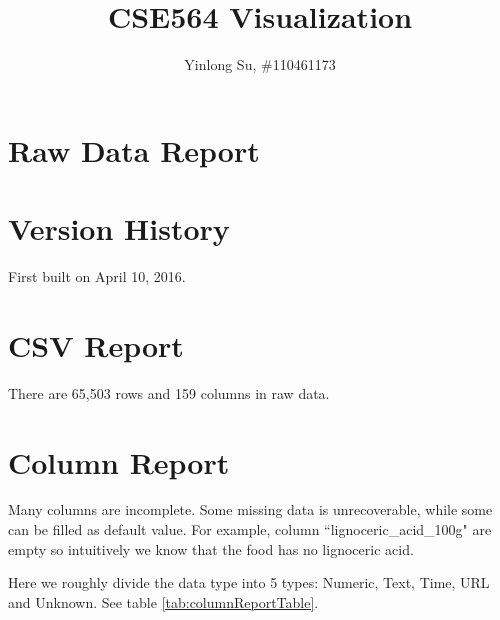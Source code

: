 \documentclass[11pt]{article}
\begin{document}
\title{CSE564 Visualization}
\author{Yinlong Su, \#110461173}
\maketitle

\section*{Raw Data Report}

\setcounter{section}{-1}
\section{Version History}

First built on April 10, 2016.

\section{CSV Report}

There are 65,503 rows and 159 columns in raw data.

\section{Column Report}

Many columns are incomplete. Some missing data is unrecoverable, while some can be filled as default value. For example, column ``lignoceric\_acid\_100g" are empty so intuitively we know that the food has no lignoceric acid.
\par
Here we roughly divide the data type into 5 types: Numeric, Text, Time, URL and Unknown. See table \ref{tab:columnReportTable}.
\par
\end{document}
